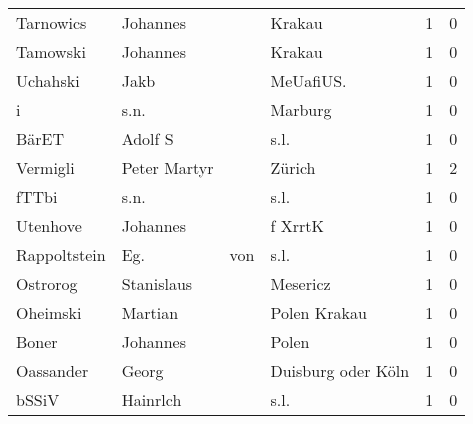 \begin{center}
\begin{tiny}
\begin{longtabu}{llllrr}
                Tarnowics &                           Johannes &             &                                      Krakau &          1 &         0 \\
                 Tamowski &                           Johannes &             &                                      Krakau &          1 &         0 \\
                 Uchahski &                               Jakb &             &                                  MeUafiUS.  &          1 &         0 \\
                        i &                               s.n. &             &                                     Marburg &          1 &         0 \\
                    BärET &                            Adolf S &             &                                        s.l. &          1 &         0 \\
                 Vermigli &                       Peter Martyr &             &                                      Zürich &          1 &         2 \\
                    fTTbi &                               s.n. &             &                                        s.l. &          1 &         0 \\
                 Utenhove &                           Johannes &             &                                     f XrrtK &          1 &         0 \\
             Rappoltstein &                                Eg. &         von &                                        s.l. &          1 &         0 \\
                 Ostrorog &                         Stanislaus &             &                                    Mesericz &          1 &         0 \\
                 Oheimski &                            Martian &             &                                Polen Krakau &          1 &         0 \\
                    Boner &                           Johannes &             &                                       Polen &          1 &         0 \\
                Oassander &                              Georg &             &                          Duisburg oder Köln &          1 &         0 \\
                    bSSiV &                           Hainrlch &             &                                        s.l. &          1 &         0 \\

\end{longtabu}
\end{tiny}
\end{center}
